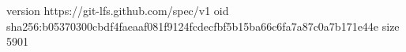 version https://git-lfs.github.com/spec/v1
oid sha256:b05370300cbdf4faeaaf081f9124fcdecfbf5b15ba66c6fa7a87c0a7b171e44e
size 5901

